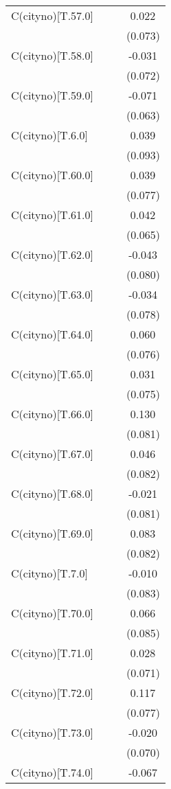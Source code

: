 \begin{table}[!htbp]
\begin{tabular}{@{\extracolsep{5pt}}lccc}
 C(cityno)[T.57.0] & & & 0.022$^{}$ \\
& & & (0.073) \\
 C(cityno)[T.58.0] & & & -0.031$^{}$ \\
& & & (0.072) \\
 C(cityno)[T.59.0] & & & -0.071$^{}$ \\
& & & (0.063) \\
 C(cityno)[T.6.0] & & & 0.039$^{}$ \\
& & & (0.093) \\
 C(cityno)[T.60.0] & & & 0.039$^{}$ \\
& & & (0.077) \\
 C(cityno)[T.61.0] & & & 0.042$^{}$ \\
& & & (0.065) \\
 C(cityno)[T.62.0] & & & -0.043$^{}$ \\
& & & (0.080) \\
 C(cityno)[T.63.0] & & & -0.034$^{}$ \\
& & & (0.078) \\
 C(cityno)[T.64.0] & & & 0.060$^{}$ \\
& & & (0.076) \\
 C(cityno)[T.65.0] & & & 0.031$^{}$ \\
& & & (0.075) \\
 C(cityno)[T.66.0] & & & 0.130$^{}$ \\
& & & (0.081) \\
 C(cityno)[T.67.0] & & & 0.046$^{}$ \\
& & & (0.082) \\
 C(cityno)[T.68.0] & & & -0.021$^{}$ \\
& & & (0.081) \\
 C(cityno)[T.69.0] & & & 0.083$^{}$ \\
& & & (0.082) \\
 C(cityno)[T.7.0] & & & -0.010$^{}$ \\
& & & (0.083) \\
 C(cityno)[T.70.0] & & & 0.066$^{}$ \\
& & & (0.085) \\
 C(cityno)[T.71.0] & & & 0.028$^{}$ \\
& & & (0.071) \\
 C(cityno)[T.72.0] & & & 0.117$^{}$ \\
& & & (0.077) \\
 C(cityno)[T.73.0] & & & -0.020$^{}$ \\
& & & (0.070) \\
 C(cityno)[T.74.0] & & & -0.067$^{}$ \\

\end{tabular}
\end{table}
